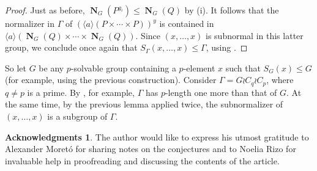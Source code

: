 \documentclass[12pt]{amsart}
\DeclareMathOperator{\NB}{\mathbf{N}}
\theoremstyle{remark}
\theoremstyle{definition}
\theoremstyle{plain}
\theoremstyle{definition}
\newtheorem*{ack}{Acknowledgments}
\numberwithin{equation}{section}
\begin{document}
\begin{proof}
	Just as before, $\NB_G(P^{g_i}) \leq \NB_G(Q)$ by  (i). It follows that the normalizer in $\Gamma$ of $(\langle a \rangle (P \times \cdots \times P))^y$ is contained in $\langle a \rangle(\NB_G(Q) \times \cdots \times \NB_G(Q))$. Since $(x, \ldots, x)$ is subnormal in this latter group, we conclude once again that $S_\Gamma(x, \ldots, x) \leq \Gamma$, using \cite[Proposition 2.6]{GunterSubnormalizer}.
\end{proof}

So let $G$ be any $p$-solvable group containing a $p$-element $x$ such that $S_G(x) \leq G$ (for example, using the previous construction). Consider $\Gamma = G \wr C_q \wr C_p$, where $q \neq p$ is a prime. By \cite[Remark 4.7]{HuppertBlackburn}, for example, $\Gamma$ has $p$-length one more than that of $G$. At the same time, by the previous lemma applied twice, the subnormalizer of $(x, \ldots, x)$ is a subgroup of $\Gamma$.

\begin{ack}
	The author would like to express his utmost gratitude to Alexander Moretó for sharing notes on the conjectures and to Noelia Rizo for invaluable help in proofreading and discussing the contents of the article.
\end{ack}
\end{document}
